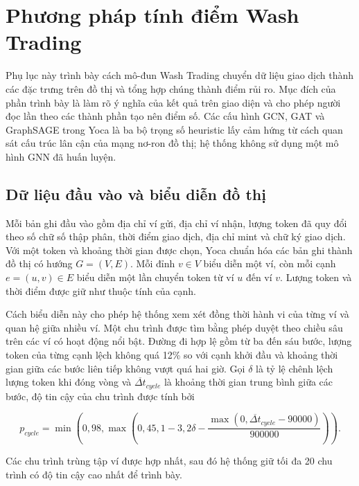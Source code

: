 \appendix

\chapter{Phương pháp tính điểm Wash Trading}
\label{appendix:wash-trading-scoring}

Phụ lục này trình bày cách mô-đun Wash Trading chuyển dữ liệu giao dịch thành các đặc trưng trên đồ thị và tổng hợp chúng thành điểm rủi ro. Mục đích của phần trình bày là làm rõ ý nghĩa của kết quả trên giao diện và cho phép người đọc lần theo các thành phần tạo nên điểm số. Các cấu hình GCN, GAT và GraphSAGE trong Yoca là ba bộ trọng số heuristic lấy cảm hứng từ cách quan sát cấu trúc lân cận của mạng nơ-ron đồ thị; hệ thống không sử dụng một mô hình GNN đã huấn luyện.

\section{Dữ liệu đầu vào và biểu diễn đồ thị}

Mỗi bản ghi đầu vào gồm địa chỉ ví gửi, địa chỉ ví nhận, lượng token đã quy đổi theo số chữ số thập phân, thời điểm giao dịch, địa chỉ mint và chữ ký giao dịch. Với một token và khoảng thời gian được chọn, Yoca chuẩn hóa các bản ghi thành đồ thị có hướng $G=(V,E)$. Mỗi đỉnh $v\in V$ biểu diễn một ví, còn mỗi cạnh $e=(u,v)\in E$ biểu diễn một lần chuyển token từ ví $u$ đến ví $v$. Lượng token và thời điểm được giữ như thuộc tính của cạnh.

Cách biểu diễn này cho phép hệ thống xem xét đồng thời hành vi của từng ví và quan hệ giữa nhiều ví. Một chu trình được tìm bằng phép duyệt theo chiều sâu trên các ví có hoạt động nổi bật. Đường đi hợp lệ gồm từ ba đến sáu bước, lượng token của từng cạnh lệch không quá 12\% so với cạnh khởi đầu và khoảng thời gian giữa các bước liên tiếp không vượt quá hai giờ. Gọi $\delta$ là tỷ lệ chênh lệch lượng token khi đóng vòng và $\overline{\Delta t}_{cycle}$ là khoảng thời gian trung bình giữa các bước, độ tin cậy của chu trình được tính bởi

\begin{equation}
p_{cycle}=\min\left(0{,}98,\max\left(0{,}45,
1-3{,}2\delta-\frac{\max(0,\overline{\Delta t}_{cycle}-90000)}{900000}\right)\right).
\end{equation}

Các chu trình trùng tập ví được hợp nhất, sau đó hệ thống giữ tối đa 20 chu trình có độ tin cậy cao nhất để trình bày.

